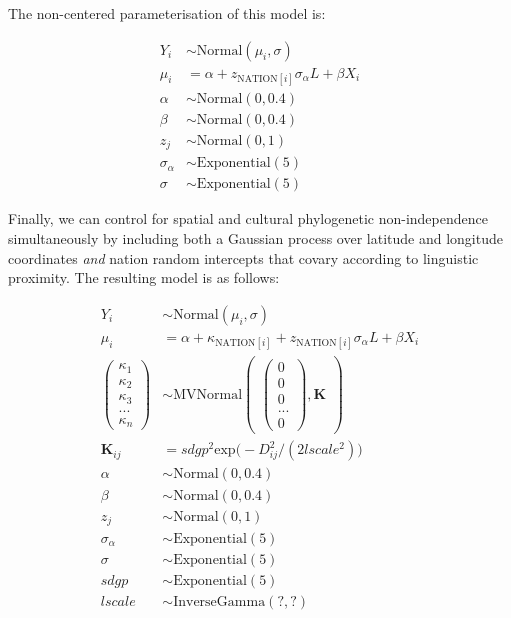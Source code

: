 \documentclass[
  man,floatsintext]{apa6}
\begin{document}
The non-centered parameterisation of this model is:

\[
\begin{aligned}
Y_{i} &\sim \text{Normal}(\mu_{i},\sigma) \\
\mu_{i} &= \alpha + z_{\text{NATION}[i]}\sigma_{\alpha}L + \beta X_{i} \\
\alpha &\sim \text{Normal}(0, 0.4) \\
\beta &\sim \text{Normal}(0, 0.4) \\
z_{j} &\sim \text{Normal}(0, 1)\\
\sigma_{\alpha} &\sim \text{Exponential}(5) \\
\sigma &\sim \text{Exponential}(5)
\end{aligned}
\]
\newpage

Finally, we can control for spatial and cultural phylogenetic non-independence simultaneously by including both a Gaussian process over latitude and longitude coordinates \emph{and} nation random intercepts that covary according to linguistic proximity. The resulting model is as follows:

\[
\begin{aligned}
Y_{i} &\sim \text{Normal}(\mu_{i},\sigma) \\
\mu_{i} &= \alpha + \kappa_{\text{NATION}[i]} + z_{\text{NATION}[i]}\sigma_{\alpha}L + \beta X_{i} \\
\begin{pmatrix}
\kappa_{1} \\ \kappa_{2} \\ \kappa_{3} \\ ... \\ \kappa_{n}
\end{pmatrix} &\sim \text{MVNormal}
\begin{pmatrix}
\begin{pmatrix}
0 \\ 0 \\ 0 \\ ... \\ 0
\end{pmatrix},\textbf{K}
\end{pmatrix}\\
\textbf{K}_{ij} &= sdgp^2 \text{exp} \big (-D_{ij}^2 / (2 lscale^2) \big )\\
\alpha &\sim \text{Normal}(0, 0.4) \\
\beta &\sim \text{Normal}(0, 0.4) \\
z_{j} &\sim \text{Normal}(0, 1)\\
\sigma_{\alpha} &\sim \text{Exponential}(5) \\
\sigma &\sim \text{Exponential}(5) \\
sdgp &\sim \text{Exponential}(5) \\
lscale &\sim \text{InverseGamma}(?,?)
\end{aligned}
\]
\end{document}
